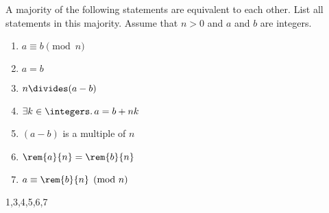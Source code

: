 \documentclass[quiz]{mcs}
\begin{document}
\begin{problem} [points = 4]
A majority of the following statements are equivalent to each other.
List all statements in this majority.  Assume that $n > 0$ and $a$ and
$b$ are integers.  
      
\begin{enumerate}
       
\item
 $a \equiv  b \pmod n$

       
\item
 $a = b$
       
\item
 $n \divides (a - b)$
       
\item
 $\exists k \in \integers.\, a = b + nk$
       
\item
 $(a - b)$ is a multiple of $n$
 
 \item
 $\rem{a}{n} = \rem{b}{n}$
 
\item
$a \equiv  \rem{b}{n}  \pmod n$
      
\end{enumerate}

\begin{solution}

1,3,4,5,6,7

\end{solution}

\end{problem}


\end{document}
